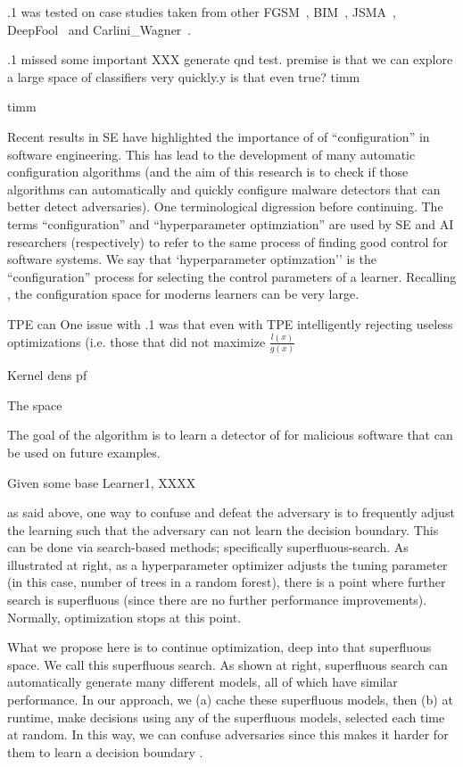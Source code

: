  
 
  {\IT}.1 was tested on case studies taken from other 
  FGSM~\cite{goodfellow2014explaining},
BIM~\cite{KurakinGB17a},
JSMA~\cite{papernot2016limitations},
DeepFool~\cite{moosavi2016deepfool} and
Carlini\_Wagner~\cite{carlini2017towards,DBLP:conf/ccs/Carlini017}. 


  {\IT}.1 missed some important
XXX generate qnd test. premise is that we can explore a large space of classifiers very quickly.y is that even true?
timm

timm

Recent results in SE have highlighted the importance of of ``configuration'' in software engineering. 
This has lead to the development of many automatic configuration algorithms (and the aim
of this research is to check if those algorithms can automatically and quickly configure malware
detectors that can better detect adversaries). One terminological digression before continuing.  
The terms   ``configuration'' and ``hyperparameter optimziation''  
are used by SE and AI researchers (respectively)
to refer to the same process of finding good control for   software systems.
We say that `hyperparameter optimzation'' is the ``configuration'' process for selecting the control parameters of a learner. Recalling  , the configuration space for moderns learners can be very large. 


 
 TPE can One issue with {\IT}.1 was that even with TPE intelligently rejecting useless optimizations (i.e. those that did not maximize  $\frac{l(x)}{g(x)}$ 

Kernel dens 
pf  

The space

The goal of the algorithm is to learn a detector of for malicious software that can be used on future examples. 

Given some base Learner1, XXXX

as said above, one way to confuse and defeat the adversary is to frequently adjust the learning such that the adversary can not learn the decision boundary. This can be done via search-based methods; specifically superfluous-search. As illustrated at right, as a hyperparameter optimizer adjusts the tuning parameter (in this case, number of trees in a random forest), there is a point where  further search is  superfluous (since there are no further performance improvements).  Normally, optimization stops at this point. 

      What we propose here is to continue optimization, deep into that superfluous space. We call this superfluous search. As shown at right,  superfluous search can automatically generate many different models, all of which have similar performance. In our approach, we (a) cache these superfluous models, then (b) at runtime, make decisions using any of the superfluous models, selected each time at random. In this way, we can confuse adversaries since this makes it harder for them to learn a  decision boundary . 

